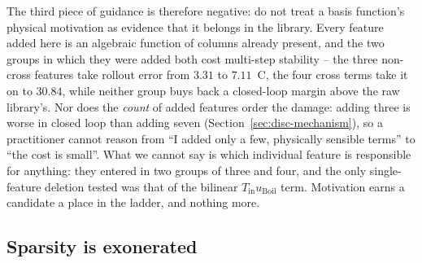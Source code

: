 The third piece of guidance is therefore negative: do not treat a basis function's
physical motivation as evidence that it belongs in the library. Every feature added
here is an algebraic function of columns already present, and the two groups in
which they were added both cost multi-step stability -- the three non-cross features
take rollout error from $3.31$ to $7.11$~\textdegree C, the four cross terms take
it on to $30.84$, while neither group buys back a closed-loop margin above the raw
library's. Nor does the \emph{count} of added features order the damage: adding
three is worse in closed loop than adding seven
(Section~\ref{sec:disc-mechanism}), so a practitioner cannot reason from ``I added
only a few, physically sensible terms'' to ``the cost is small''. What we cannot
say is which individual feature is responsible for anything: they entered in two
groups of three and four, and the only single-feature deletion tested was that of
the bilinear $T_{\text{in}}u_{\text{Boil}}$ term. Motivation earns a candidate a place in the ladder, and nothing more.

\subsection{Sparsity is exonerated}
\label{sec:disc-sparsity}

